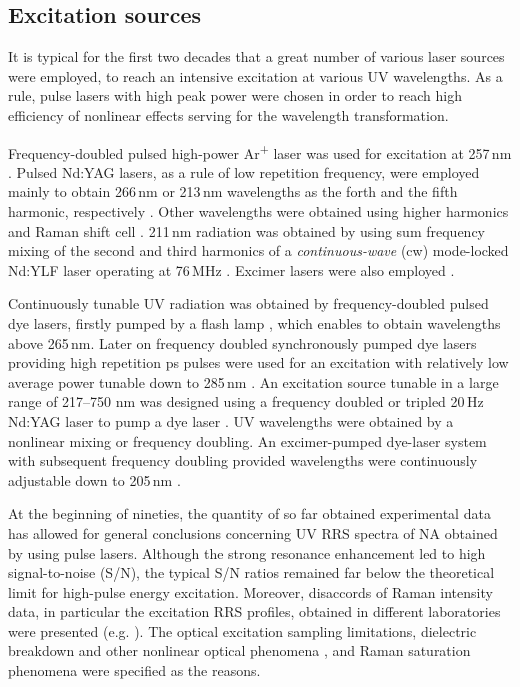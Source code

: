 \subsection{Excitation sources}

It is typical for the first two decades that a great number of various laser
sources were employed, to reach an intensive excitation at various UV
wavelengths.
As a rule, pulse lasers with high peak power were chosen in order to reach high
efficiency of nonlinear effects serving for the wavelength transformation.

Frequency-doubled pulsed high-power Ar\textsuperscript{+} laser was used for
excitation at 257\,nm
\parencite{%
	Harada1975,%
	Pezolet1975,%
	Nishimura1977%
}.
Pulsed Nd:YAG lasers, as a rule of low repetition frequency, were employed
mainly to obtain 266\,nm or 213\,nm wavelengths as the forth and the fifth
harmonic, respectively
\parencite{%
	Ziegler1981,%
	Toyama1993%
}.
Other wavelengths were obtained using higher harmonics
\parencite{Kubasek1985}
and  Raman shift cell
\parencite{%
	Fodor1985,%
	Nishimura1987%
}.
211\,nm radiation was obtained by using sum frequency mixing of the second and
third harmonics of a
\emph{continuous-wave} (cw)
mode-locked Nd:YLF laser operating at 76\,MHz
\parencite{Leonard1994}.
Excimer lasers were also employed
\parencite{Ziegler1983}.

Continuously tunable UV radiation was obtained by frequency-doubled pulsed dye
lasers, firstly pumped by a flash lamp
\parencite{%
	Asher1977,%
	Blazej1977%
},
which enables to obtain wavelengths above 265\,nm.
Later on frequency doubled synchronously pumped dye lasers providing high
repetition ps pulses were used for an excitation with relatively low average
power tunable down to 285\,nm
\parencite{%
	Bushaw1978,%
	Samanta1982,%
	Benson1992%
}.
An excitation source tunable in a large range of 217–750 nm was designed using
a frequency doubled or tripled 20\,Hz Nd:YAG laser to pump a dye laser
\parencite{Asher1983}.
UV wavelengths were obtained by a nonlinear mixing or frequency doubling.
An excimer-pumped dye-laser system with subsequent frequency doubling provided
wavelengths were continuously adjustable down to 205\,nm
\parencite{Gfrorer1993a}.

At the beginning of nineties, the quantity of so far obtained experimental data
has allowed for general conclusions concerning UV RRS spectra of NA obtained by
using pulse lasers.
Although the strong resonance enhancement led to high signal-to-noise (S/N),
the typical S/N ratios remained far below the theoretical limit for high-pulse
energy excitation.
Moreover, disaccords of Raman intensity data, in particular the excitation RRS
profiles, obtained in different laboratories were presented (e.g.
\cite{Bushaw1980}).
The optical excitation sampling limitations, dielectric breakdown and other
nonlinear optical phenomena
\parencite{Teraoka1990},
and Raman saturation phenomena
\parencite{%
	Harmon1990,%
	Johnson1986,%
	Ludwig1988a,%
	Song1991a,%
	Sweeney1990,%
	Teraoka1990%
}
were specified as the reasons.


